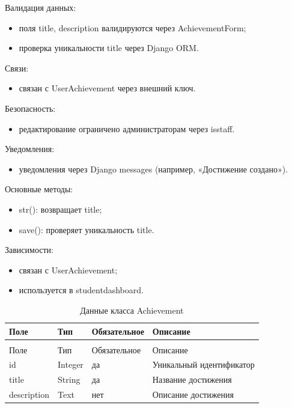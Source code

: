 Валидация данных:
	\begin{itemize}
		\item поля title, description валидируются через AchievementForm;
		\item проверка уникальности title через Django ORM.
	\end{itemize}
	
Связи:
	\begin{itemize}
		\item связан с UserAchievement через внешний ключ.
	\end{itemize}
	
Безопасность:
	\begin{itemize}
		\item редактирование ограничено администраторам через isstaff.
	\end{itemize}
	
Уведомления:
	\begin{itemize}
		\item уведомления через Django messages (например, «Достижение создано»).
	\end{itemize}
	
Основные методы:
	\begin{itemize}
		\item str(): возвращает title;
		\item save(): проверяет уникальность title.
	\end{itemize}
	
Зависимости:
	\begin{itemize}
		\item связан с UserAchievement;
		\item используется в studentdashboard.
	\end{itemize}


\begin{xltabular}{\textwidth}{|l|l|l|X|}
	\caption{Данные класса Achievement\label{tab:achievement_attributes}}\\
	\hline
	Поле & Тип & Обязательное & Описание \\ \hline
	\endfirsthead
	\\
	\hline
	Поле & Тип & Обязательное & Описание \\ \hline
	\endhead
	id & Integer & да & Уникальный идентификатор \\ \hline
	title & String & да & Название достижения \\ \hline
	description & Text & нет & Описание достижения \\ \hline
\end{xltabular}

